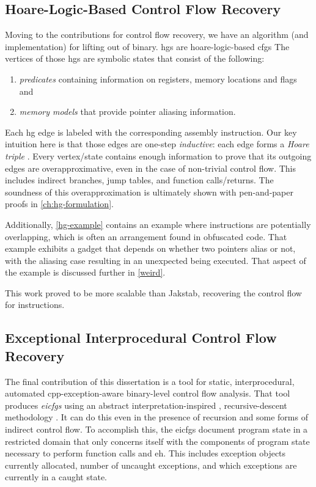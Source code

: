 \subsection{Hoare-Logic-Based Control Flow Recovery}
Moving to the contributions for control flow recovery, we have an algorithm (and implementation) for lifting  out of  binary.
\Acp{hg} are \gls{hoare-logic}-based \acp{cfg}
The vertices of those \acp{hg} are symbolic states that consist of the following:
\begin{enumerate}
  \item \emph{predicates} containing information on registers, memory locations and flags and
  \item \emph{memory models} that provide pointer aliasing information.
\end{enumerate}
Each \ac{hg} edge is labeled with the corresponding assembly instruction.
Our key intuition here is that those edges are one-step \emph{inductive}:
each edge forms a \emph{Hoare triple}
\autocite{hoare1969axiomatic}.
Every vertex/state contains enough information to prove that its outgoing edges are overapproximative,
even in the case of non-trivial control flow.
This includes indirect branches, jump tables, and function calls/returns.
The soundness of this overapproximation is ultimately shown with pen-and-paper proofs in \cref{ch:hg-formulation}.

Additionally, \cref{hg-example} contains an example where instructions are potentially overlapping, which is often an arrangement found in obfuscated code.
That example exhibits a  gadget that depends on whether two pointers alias or not, with the aliasing case resulting in an unexpected  being executed. That aspect of the example is discussed further in \cref{weird}.

This work proved to be more scalable than Jakstab, recovering the control flow for  instructions.

\subsection{Exceptional Interprocedural Control Flow Recovery}
The final contribution of this dissertation is a tool for static, interprocedural, automated \gls{cpp}-exception-aware \autocite{cxxEhAbi} binary-level control flow analysis.
That tool produces \emph{\acp{eicfg}} using an abstract interpretation-inspired \autocite{cousot1976static,cousot1977abstract}, recursive-descent methodology \autocite{nagy2022bobw}.
It can do this even in the presence of recursion and some forms of indirect control flow.
To accomplish this, the \acp{eicfg} document program state in a restricted domain that only concerns itself with the components of program state necessary to perform function calls and \ac{eh}.
This includes exception objects currently allocated, number of uncaught exceptions, and which exceptions are currently in a caught state.

